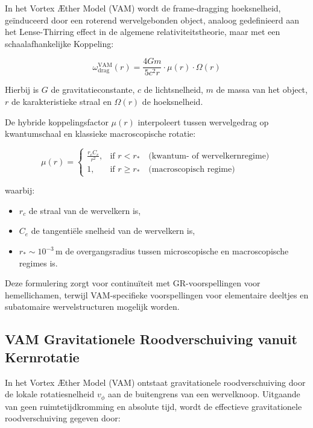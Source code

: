 In het Vortex Æther Model (VAM) wordt de frame-dragging hoeksnelheid, geïnduceerd door een roterend wervelgebonden object, analoog gedefinieerd aan het Lense-Thirring effect in de algemene relativiteitstheorie, maar met een schaalafhankelijke Koppeling:

\begin{equation}
    \omega_{\text{drag}}^{\text{VAM}}(r) =
    \frac{4 G m}{5 c^2 r} \cdot \mu(r) \cdot \Omega(r)
\end{equation}

Hierbij is \( G \) de gravitatieconstante, \( c \) de lichtsnelheid, \( m \) de massa van het object, \( r \) de karakteristieke straal en \( \Omega(r) \) de hoeksnelheid.

De hybride koppelingsfactor \( \mu(r) \) interpoleert tussen wervelgedrag op kwantumschaal en klassieke macroscopische rotatie:

\begin{equation}
    \mu(r) =
    \begin{cases}
        \displaystyle \frac{r_c C_e}{r^2}, & \text{if } r < r_\ast \quad \text{(kwantum- of wervelkernregime)} \\
        1, & \text{if } r \geq r_\ast \quad \text{(macroscopisch regime)}
    \end{cases}
\end{equation}

waarbij:
\begin{itemize}
    \item \( r_c \) de straal van de wervelkern is,
    \item \( C_e \) de tangentiële snelheid van de wervelkern is,
    \item \( r_\ast \sim 10^{-3} \, \text{m} \) de overgangsradius tussen microscopische en macroscopische regimes is.
\end{itemize}

Deze formulering zorgt voor continuïteit met GR-voorspellingen voor hemellichamen, terwijl VAM-specifieke voorspellingen voor elementaire deeltjes en subatomaire wervelstructuren mogelijk worden.


\subsection*{VAM Gravitationele Roodverschuiving vanuit Kernrotatie}

In het Vortex Æther Model (VAM) ontstaat gravitationele roodverschuiving door de lokale rotatiesnelheid \( v_\phi \) aan de buitengrens van een wervelknoop. Uitgaande van geen ruimtetijdkromming en absolute tijd, wordt de effectieve gravitationele roodverschuiving gegeven door:

